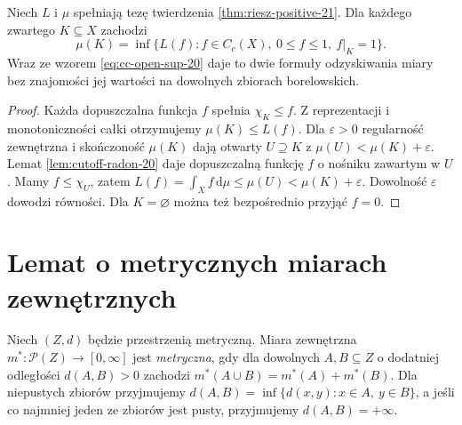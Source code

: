 \begin{wniosek}
\label{it:cor:radon-compact-inf}
Niech $L$ i $\mu$ spełniają tezę twierdzenia
\ref{thm:riesz-positive-21}. Dla każdego zwartego
$K\subseteq X$ zachodzi
\[
 \mu(K)=\inf\{L(f):f\in C_c(X),\
             0\le f\le1,\ f|_K=1\}.
\]
Wraz ze wzorem \eqref{eq:cc-open-sup-20} daje to
dwie formuły odzyskiwania miary bez znajomości
jej wartości na dowolnych zbiorach borelowskich.
\end{wniosek}
\begin{proof}
Każda dopuszczalna funkcja $f$ spełnia
$\chi_K\le f$. Z reprezentacji i monotoniczności
całki otrzymujemy $\mu(K)\le L(f)$.
Dla $\varepsilon>0$ regularność zewnętrzna
i skończoność $\mu(K)$ dają otwarty $U\supseteq K$
z $\mu(U)<\mu(K)+\varepsilon$.
Lemat \ref{lem:cutoff-radon-20} daje dopuszczalną
funkcję $f$ o nośniku zawartym w $U$.
Mamy $f\le\chi_U$, zatem
$L(f)=\int_X f\,\mathrm d\mu\le\mu(U)
<\mu(K)+\varepsilon$.
Dowolność $\varepsilon$ dowodzi równości.
Dla $K=\varnothing$ można też bezpośrednio
przyjąć $f=0$.
\end{proof}

\section{Lemat o metrycznych miarach zewnętrznych}
\begin{definicja}
\label{def:metric-outer-21}
Niech $(Z,d)$ będzie przestrzenią metryczną.
Miara zewnętrzna $m^*:\mathcal P(Z)\to[0,\infty]$
jest \emph{metryczna}, gdy dla dowolnych $A,B\subseteq Z$
o dodatniej odległości $d(A,B)>0$ zachodzi
$m^*(A\cup B)=m^*(A)+m^*(B)$.
Dla niepustych zbiorów przyjmujemy
$d(A,B)=\inf\{d(x,y):x\in A,\ y\in B\}$,
a jeśli co najmniej jeden ze zbiorów jest pusty,
przyjmujemy $d(A,B)=+\infty$.
\end{definicja}


